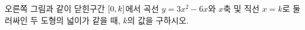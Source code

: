 \noindent\begin{minipage}[t]{0.58\linewidth}\vspace{0pt}\raggedright 오른쪽 그림과 같이 닫힌구간 $[0{,}\mkern3mu\mathopen{}k]$에서 곡선 $y=3x^2-6x$와 $x$축 및 직선 $x=k$로 둘러싸인 두 도형의 넓이가 같을 때, $k$의 값을 구하시오. \end{minipage}\hfill\begin{minipage}[t]{0.4\linewidth}\vspace{0pt}\centering \resizebox{\ifdim\width>\linewidth\linewidth\else\width\fi}{!}{}\end{minipage}\par
